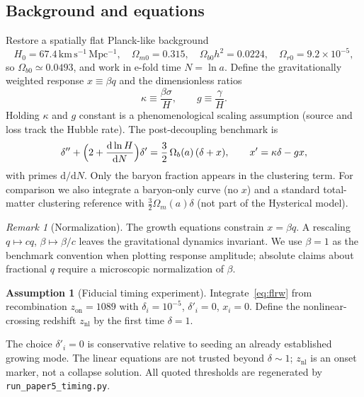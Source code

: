 \documentclass[11pt]{article}
\theoremstyle{definition}
\newtheorem{assumption}[theorem]{Assumption}
\theoremstyle{remark}
\newtheorem{remark}[theorem]{Remark}
\newcommand{\dd}{\mathrm{d}}
\begin{document}
\subsection{Background and equations}
Restore a spatially flat Planck-like background~\cite{Planck2018}
\begin{equation}
H_0=67.4\,\mathrm{km\,s^{-1}\,Mpc^{-1}},\quad
\Omega_{m0}=0.315,\quad
\Omega_{b0}h^{2}=0.0224,\quad
\Omega_{r0}=9.2\times10^{-5},
\end{equation}
so $\Omega_{b0}\simeq0.0493$, and work in e-fold time $N=\ln a$.
Define the gravitationally weighted response $x\equiv\beta q$ and the dimensionless ratios
\begin{equation}
\label{eq:kappa-g}
\boxed{\kappa\equiv\frac{\beta\sigma}{H},\qquad g\equiv\frac{\gamma}{H}.}
\end{equation}
Holding $\kappa$ and $g$ constant is a phenomenological scaling assumption (source and loss track the Hubble rate).
The post-decoupling benchmark is
\begin{equation}
\label{eq:flrw}
\delta''+\Bigl(2+\frac{\dd\ln H}{\dd N}\Bigr)\delta'
=\frac32\,\Omega_b(a)\,(\delta+x),
\qquad
x'=\kappa\delta-gx,
\end{equation}
with primes $\dd/\dd N$.
Only the baryon fraction appears in the clustering term.
For comparison we also integrate a baryon-only curve (no $x$) and a standard total-matter clustering reference with $\tfrac32\Omega_m(a)\delta$ (not part of the Hysterical model).

\begin{remark}[Normalization]
The growth equations constrain $x=\beta q$.
A rescaling $q\mapsto cq$, $\beta\mapsto\beta/c$ leaves the gravitational dynamics invariant.
We use $\beta=1$ as the benchmark convention when plotting response amplitude; absolute claims about fractional $q$ require a microscopic normalization of $\beta$.
\end{remark}

\begin{assumption}[Fiducial timing experiment]
\label{ass:timing}
Integrate~\eqref{eq:flrw} from recombination $z_{\mathrm{on}}=1089$ with
$\delta_i=10^{-5}$, $\delta'_i=0$, $x_i=0$.
Define the nonlinear-crossing redshift $z_{\mathrm{nl}}$ by the first time $\delta=1$.
\end{assumption}

The choice $\delta'_i=0$ is conservative relative to seeding an already established growing mode.
The linear equations are not trusted beyond $\delta\sim1$; $z_{\mathrm{nl}}$ is an onset marker, not a collapse solution.
All quoted thresholds are regenerated by \texttt{run\_paper5\_timing.py}.
\end{document}
